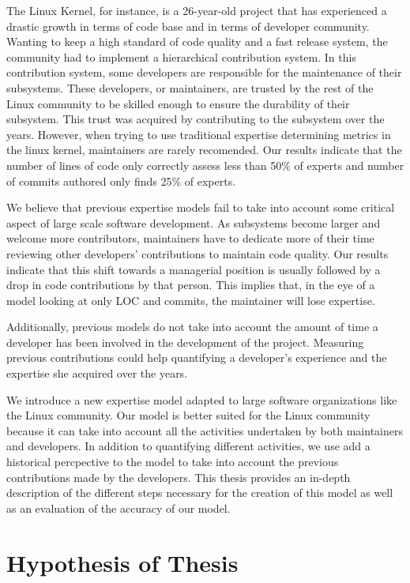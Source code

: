 The Linux Kernel, for instance, is a 26-year-old project that has experienced a drastic growth in terms of code base and in terms of developer community. Wanting to keep a high standard of code quality and a fast release system, the community had to implement a hierarchical contribution system. In this contribution system, some developers are responsible for the maintenance of their subsystems. These developers, or maintainers, are trusted by the rest of the Linux community to be skilled enough to ensure the durability of their subsystem. This trust was acquired by contributing to the subsystem over the years. However, when trying to use traditional expertise determining metrics in the linux kernel, maintainers are rarely recomended. Our results indicate that the number of lines of code only correctly assess less than 50\% of experts and number of commits authored only finds 25\% of experts. 


We believe that previous expertise models fail to take into account some critical aspect of large scale software development. As subsystems become larger and welcome more contributors, maintainers have to dedicate more of their time reviewing other developers' contributions to maintain code quality. Our results indicate that this shift towards a managerial position is usually followed by a drop in code contributions by that person. This implies that, in the eye of a model looking at only \ac{LOC} and commits, the maintainer will lose expertise. 

Additionally, previous models do not take into account the amount of time a developer has been involved in the development of the project. Measuring previous contributions could help quantifying a developer's experience and the expertise she acquired over the years. 

We introduce a new expertise model adapted to large software organizations like the Linux community. Our model is better suited for the Linux community because it can take into account all the activities undertaken by both maintainers and developers. In addition to quantifying different activities, we use add a historical percpective to the model to take into account the previous contributions made by the developers. This thesis provides an in-depth description of the different steps necessary for the creation of this model as well as an evaluation of the accuracy of our model. 



\section{Hypothesis of Thesis}

